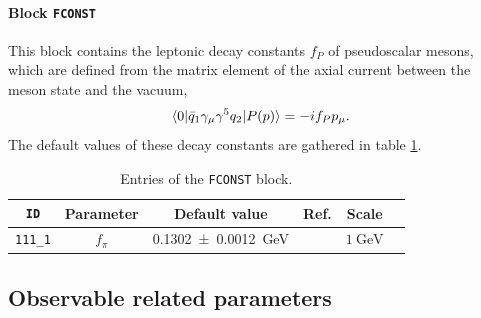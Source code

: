 \documentclass[preprint,11pt]{elsarticle}
\newcommand{\gev}{\giga\electronvolt}
\begin{document}
\paragraph{Block \texttt{FCONST}}
This block contains the leptonic decay constants $f_P$ of pseudoscalar mesons, which are defined from the matrix element of the axial current between the meson state and the vacuum,
\begin{equation}
    \mel{0}{\bar q_1\gamma_\mu\gamma^5q_2}{P(p)}=-if_Pp_\mu.
\end{equation}
The default values of these decay constants are gathered in table \ref{tab:FCONST}.
\begin{table}[!ht]
    \centering
    \begin{tabular}{cccccc}
        \hline
        \texttt{ID} & Parameter & Default value & Ref. & Scale \\
        \hline
        \texttt{111\_1}&$f_\pi$&\SI{0.1302(12)}{\gev}&\cite{FLAG:2024oxs}&$\SI{1}{\gev}$\\
        \hline
    \end{tabular}
    \caption{Entries of the \texttt{FCONST} block.}
    \label{tab:FCONST}
\end{table}

\subsection{Observable related parameters}\label{sec:obs_params}
\end{document}
